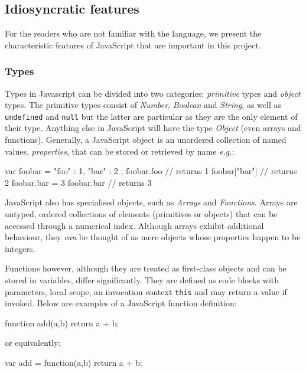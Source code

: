 \subsection{Idiosyncratic features}
For the readers who are not familiar with the language, we present the characteristic features of JavaScript \cite{flanagan2006javascript} that are important in this project.

\subsubsection{Types}
Types in Javascript can be divided into two categories: \emph{primitive} types and \emph{object} types. The primitive types consist of \emph{Number}, \emph{Boolean} and \emph{String}, as well as \texttt{undefined} and \texttt{null} but the latter are particular as they are the only element of their type. Anything else in JavaScript will have the type \emph{Object} (even arrays and functions). Generally, a JavaScript object is an unordered collection of named values, \emph{properties}, that can be stored or retrieved by name \emph{e.g.}:

\begin{code}[caption=JavaScript objects,label=jsobj]
var foobar = { "foo" : 1,
               "bar" : 2 };
foobar.foo     // returns 1
foobar["bar"]  // returns 2
foobar.bar = 3
foobar.bar     // returns 3
\end{code}

JavaScript also has specialised objects, such as \emph{Arrays} and \emph{Functions}. Arrays are untyped, ordered collections of elements (primitives or objects) that can be accessed through a numerical index. Although arrays exhibit additional behaviour, they \emph{can} be thought of as mere objects whose properties happen to be integers.

Functions however, although they are treated as first-class objects and can be stored in variables, differ significantly. They are defined as code blocks with parameters, local scope, an invocation context \texttt{this} and may return a value if invoked. Below are examples of a JavaScript function definition:

\begin{code}
function add(a,b) {
    return a + b;
}
\end{code}
\newline or equivalently:

\begin{code}[caption=JavaScript function definitions,label=jsfunctions]
var add = function(a,b) {
    return a + b;
}
\end{code}

